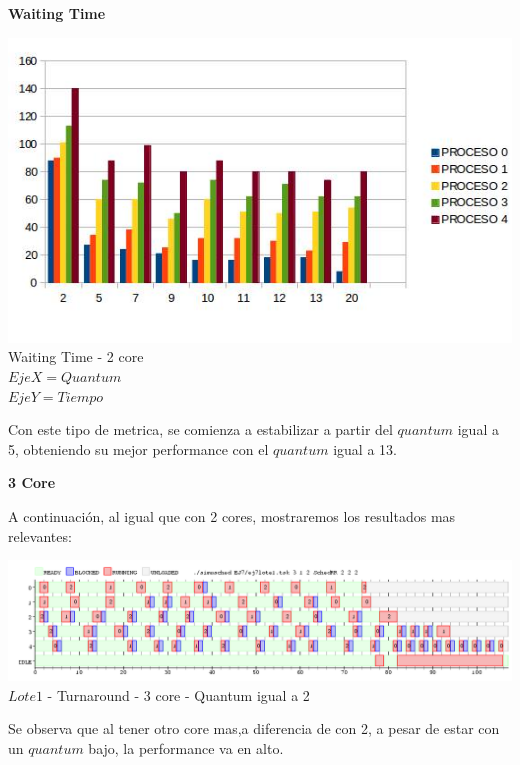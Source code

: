  \begin{center}
  \textbf{Waiting Time}
 \end{center}

  \begin{center}
    	\includegraphics[width=1\textwidth]{./EJ7/waiting2core.jpg}
	{Waiting Time - 2 core}	\\
	{$Eje X = Quantum$\\$Eje Y = Tiempo$}\\
 \end{center} 
 
 \indent Con este tipo de metrica, se comienza a estabilizar a partir del $quantum$ igual
 a 5, obteniendo su mejor  performance con el $quantum$ igual a 13.\\
 
   \begin{center}
   \textbf{3 Core}
   \end{center}
   \indent A continuación, al igual que con 2 cores, mostraremos los resultados mas relevantes:
   
   \begin{center}
    	\includegraphics[width=450pt]{./EJ7/ej7tour3core1quan.png}
	{$Lote 1$ - Turnaround - 3 core - Quantum igual a 2}	
 \end{center}

 \indent Se observa que al tener otro core mas,a diferencia de con 2, 
 a pesar de estar con un $quantum$ bajo, la performance va en alto.\\ 
 
